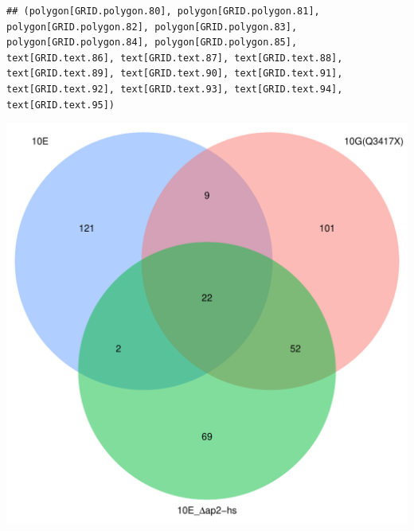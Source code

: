 \documentclass{article}\usepackage[]{graphicx}\usepackage[]{color}
\makeatletter
\newenvironment{kframe}{%
 \def\at@end@of@kframe{}%
 \ifinner\ifhmode%
  \def\at@end@of@kframe{\end{minipage}}%
  \begin{minipage}{\columnwidth}%
 \fi\fi%
 \def\FrameCommand##1{\hskip\@totalleftmargin \hskip-\fboxsep
 \colorbox{shadecolor}{##1}\hskip-\fboxsep
     \hskip-\linewidth \hskip-\@totalleftmargin \hskip\columnwidth}%
 \MakeFramed {\advance\hsize-\width
   \@totalleftmargin\z@ \linewidth\hsize
   \@setminipage}}%
 {\par\unskip\endMakeFramed%
 \at@end@of@kframe}
\newenvironment{knitrout}{}{} %
\makeatother
\begin{document}
\begin{knitrout}
\color{fgcolor}\begin{kframe}
\begin{verbatim}
## (polygon[GRID.polygon.80], polygon[GRID.polygon.81], polygon[GRID.polygon.82], polygon[GRID.polygon.83], polygon[GRID.polygon.84], polygon[GRID.polygon.85], text[GRID.text.86], text[GRID.text.87], text[GRID.text.88], text[GRID.text.89], text[GRID.text.90], text[GRID.text.91], text[GRID.text.92], text[GRID.text.93], text[GRID.text.94], text[GRID.text.95])
\end{verbatim}
\end{kframe}

{\centering \includegraphics[width=1\linewidth,height=.4\textheight]{figure/minimal-venn_t2_3fc_down_venn-1} 

}



\end{knitrout}
\end{document}
